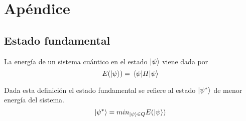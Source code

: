 \documentclass{article}
\begin{document}
\newpage
\section{Apéndice}
\label{sec:apendice}

\subsection{Estado fundamental}
\label{subsec:estado_fundamental}
La energía de un sistema cuántico en el estado \( \ket{\psi} \) viene dada por \[ E(\ket{\psi}) = \expval{H}{\psi} \]

Dada esta definición el estado fundamental se refiere al estado \(\ket{\psi^*}\) de menor energía del sistema.
  \[ \ket{\psi^*} = min_{\ket{\psi} \in Q} E(\ket{\psi}) \]



\end{document}
